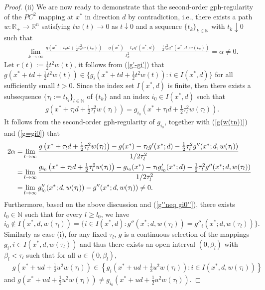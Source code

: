 \documentclass[11pt]{article}
\theoremstyle{definition}
\theoremstyle{remark}
\numberwithin{equation}{section}
\begin{document}
\begin{proof}
(ii) We are now ready to demonstrate that the second-order gph-regularity of the $PC^2$ mapping at $x^*$ in direction $d$ by contradiction, i.e.,
 there exists
a path $w:\mathbb{R}_{+}\to \mathbb{R}^n$ satisfying $t w(t)\to 0$ as $t\downarrow 0$ and a sequence $\{t_k\}_{k\in \mathbb{N}}$ with $t_k\downarrow 0$ such that
\begin{align}\label{g(w(tn))}
    &\lim_{k \to \infty}\frac{g\left(x^*+t_k d+\frac{1}{2}t_k^2w(t_k)\right)-g(x^*)-t_k g'(x^*;d)-\frac{1}{2}t_k^2g''(x^*;d,w(t_k))}
{t_k^2} =\alpha\neq 0.
\end{align}
Let $r(t):=\frac{1}{2}t^2w(t)$, it follows from (\ref{g'-gi'}) that $g\left(x^*+td+\frac{1}{2}t^2w(t)\right)\in \{g_i\left(x^*+td+\frac{1}{2}t^2w(t)\right):i\in I(x^*,d)\}$ for all sufficiently small $t>0$.
Since the index set $I(x^*,d)$ is finite, then there exists  a subsequence $\{\tau_l:=t_{k_l}\}_{l\in \mathbb{N}}$ of $\{t_k\}$ and an index $i_0\in I(x^*,d)$ such that
 \begin{align}\label{g=gi0}
     & g\left(x^*+\tau_l d+\frac{1}{2}\tau_l^2w(\tau_l)\right)= g_{i_0}\left(x^*+\tau_l d+\frac{1}{2}\tau_l^2w(\tau_l)\right).
 \end{align}
 It follows from the  second-order gph-regularity of $g_{i_0}$, together with  (\ref{g(w(tn))}) and (\ref{g=gi0}) that
  \begin{align}\label{g''neq gi0''}
 2\alpha =&\lim_{l \to \infty}\frac{g\left(x^*+\tau_l d+\frac{1}{2}\tau_l^2w(\tau_l)\right)-g(x^*)-\tau_l g'(x^*;d)-\frac{1}{2}\tau_l^2g''(x^*;d,w(\tau_l))}
{1/2\tau_l^2}\notag\\
=&\lim_{l \to \infty}\frac{g_{i_0}\left(x^*+\tau_l d+\frac{1}{2}\tau_l^2w(\tau_l)\right)-g_{i_0}(x^*)-\tau_l g_{i_0}'(x^*;d)-\frac{1}{2}\tau_l^2g''(x^*;d,w(\tau_l))}
{1/2\tau_l^2}\notag\\
   =& \lim\limits_{l\to \infty} g_{i_0}''(x^*;d,w(\tau_l))-g''(x^*;d,w(\tau_l))\neq0.
 \end{align}
 Furthermore, based on the above discussion and (\ref{g''neq gi0''}),  there exists  $l_0\in \mathbb{N}$ such that for every $l\ge l_0$, we have
 $$i_0\notin I(x^*,d,w(\tau_l))=\{i\in I(x^*,d):g''(x^*;d,w(\tau_l))=g''_i(x^*;d,w(\tau_l))\}.$$
Similarly as case (i), for any fixed $\tau_l$, $g$ is a continuous selection of the mappings $g_i, i\in I(x^*,d,w(\tau_l))$  and thus there exists an open interval $(0,\beta_l)$ with $\beta_l<\tau_l$ such that for all $u\in (0,\beta_l)$,
 \begin{align}\label{t in(0,beta)}
& g\left(x^*+u d+\frac{1}{2}u^2 w(\tau_l)\right)\in \left\{g_{i}\left(x^*+u d+\frac{1}{2}u^2 w(\tau_l)\right): i\in I(x^*,d,w(\tau_l))\right\}
\end{align}
and   $g\left(x^*+u d+\frac{1}{2}u^2 w(\tau_l)\right)\neq g_{i_0}\left(x^*+u d+\frac{1}{2}u^2 w(\tau_l)\right)$.


\end{proof}
\end{document}
